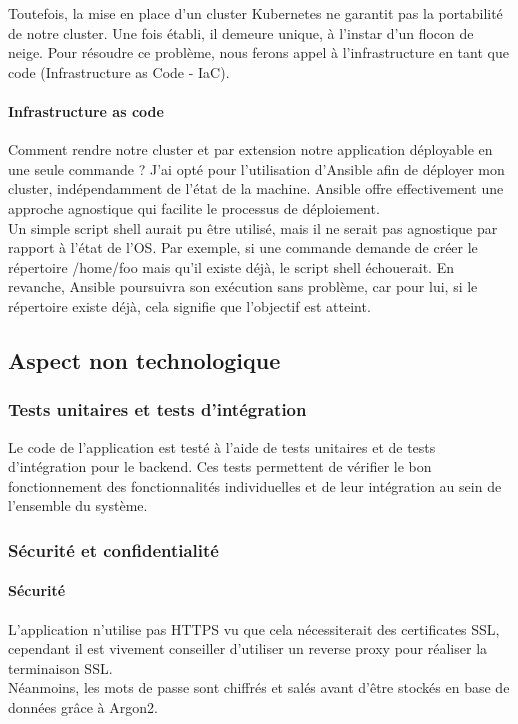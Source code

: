 Toutefois, la mise en place d'un cluster Kubernetes ne garantit pas la portabilité de notre cluster.
Une fois établi, il demeure unique, à l'instar d'un flocon de neige.
Pour résoudre ce problème, nous ferons appel à l'infrastructure en tant que code (Infrastructure as Code - IaC).

\paragraph{Infrastructure as code}
Comment rendre notre cluster et par extension notre application déployable en une seule commande ?
J'ai opté pour l'utilisation d'Ansible afin de déployer mon cluster, indépendamment de l'état de la machine.
Ansible offre effectivement une approche agnostique qui facilite le processus de déploiement.\\

Un simple script shell aurait pu être utilisé, mais il ne serait pas agnostique par rapport à l'état de l'OS\@.
Par exemple, si une commande demande de créer le répertoire /home/foo mais qu'il existe déjà, le script shell échouerait.
En revanche, Ansible poursuivra son exécution sans problème, car pour lui, si le répertoire existe déjà, cela signifie que l'objectif est atteint.\\

\subsection{Aspect non technologique}\label{subsec:aspect-non-technologique}

\subsubsection{Tests unitaires et tests d'intégration}

Le code de l'application est testé à l'aide de tests unitaires et de tests d'intégration pour le backend.
Ces tests permettent de vérifier le bon fonctionnement des fonctionnalités individuelles et de leur intégration au sein de l'ensemble du système.

\subsubsection{Sécurité et confidentialité}

\paragraph{Sécurité}
L'application n'utilise pas HTTPS vu que cela nécessiterait des certificates SSL, cependant il est vivement conseiller d'utiliser un reverse proxy pour réaliser la terminaison SSL.\\
Néanmoins, les mots de passe sont chiffrés et salés avant d'être stockés en base de données grâce à Argon2.\\

